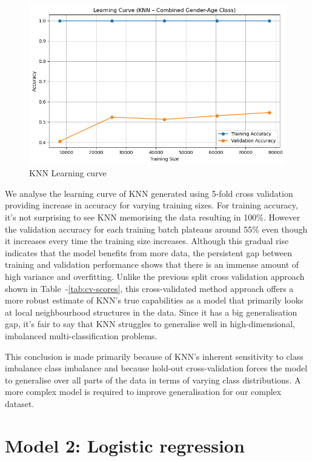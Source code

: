 \documentclass[10pt,twocolumn]{article}
\begin{document}
\begin{figure}[H]
    \centering
    \includegraphics[width=0.85\linewidth]{images/knn/learning rate and cross validation.png}
    \caption{KNN Learning curve}
    \label{fig:knn-lrate}
\end{figure}
We analyse the learning curve of KNN generated using 5-fold cross validation providing increase in accuracy for varying training sizes. For training accuracy, it's not surprising to see KNN memorising the data resulting in 100\%. However the validation accuracy for each training batch plateaus around 55\% even though it increases every time the training size increases. Although this gradual rise indicates that the model benefits from more data, the persistent gap between training and validation performance shows that there is an immense amount of high variance and overfitting. Unlike the previous split cross validation approach shown in Table~-\ref{tab:cv-scores}, this cross-validated method approach offers a more robust estimate of KNN's true capabilities as a model that primarily looks at local neighbourhood structures in the data. Since it has a big generalisation gap, it's fair to say that KNN struggles to generalise well in high-dimensional, imbalanced multi-classification problems. 

This conclusion is made primarily because of KNN's inherent sensitivity to class imbalance class imbalance and because hold-out cross-validation forces the model to generalise over all parts of the data in terms of varying class distributions.  A more complex model is required to improve generalisation for our complex dataset.

\section{Model 2: Logistic regression}
\end{document}
